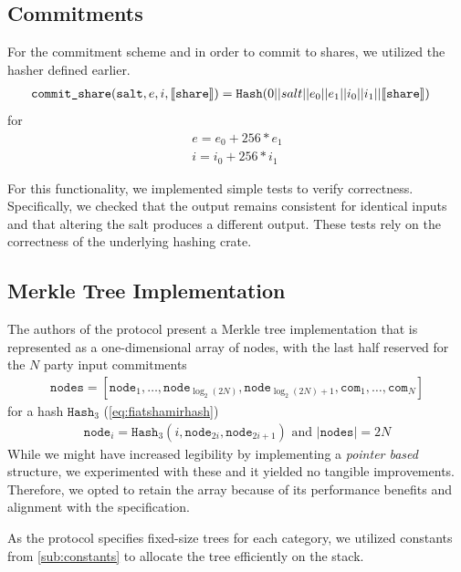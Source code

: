 \documentclass[11pt]{report}
\theoremstyle{definition}
\theoremstyle{plain}
\begin{document}
\subsection{Commitments}

For the commitment scheme and in order to commit to shares, we utilized the hasher defined earlier.
\begin{align*}
   & \texttt{commit\_share}(\texttt{salt}, e, i, \llbracket \texttt{share} \rrbracket) = \texttt{Hash}(0 || salt || e_0 || e_1 || i_0 || i_1 || \llbracket \texttt{share} \rrbracket)
\end{align*}
for
\begin{align*}
  e = e_0 + 256 * e_1 \\
  i = i_0 + 256 * i_1
\end{align*}

For this functionality, we implemented simple tests to verify correctness. Specifically, we checked that the output remains consistent for identical inputs and that altering the salt produces a different output. These tests rely on the correctness of the underlying hashing crate.

\subsection{Merkle Tree Implementation}\label{sub:merkle_tree_impl}

The authors of the protocol present a Merkle tree implementation that is represented as a one-dimensional array of nodes, with the last half reserved for the $N$ party input commitments
\begin{align*}
  \texttt{nodes} = [\texttt{node}_1, \dots, \texttt{node}_{\log_2(2N)}, \texttt{node}_{\log_2(2N)+1}, \texttt{com}_1, \dots, \texttt{com}_N]
\end{align*}
for a hash $\texttt{Hash}_3$ (\autoref{eq:fiatshamirhash})
\begin{align*}
  \texttt{node}_i = \texttt{Hash}_3(i, \texttt{node}_{2i}, \texttt{node}_{2i + 1})\text{ and } |\texttt{nodes}| = 2N
\end{align*}
While we might have increased legibility by implementing a \textit{pointer based} structure, we experimented with these and it yielded no tangible improvements. Therefore, we opted to retain the array because of its performance benefits and alignment with the specification.

As the protocol specifies fixed-size trees for each category, we utilized constants from \autoref{sub:constants} to allocate the tree efficiently on the stack.
\end{document}
